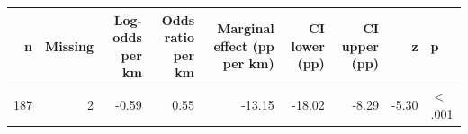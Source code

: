 \begingroup\footnotesize
\begin{tabular}{rrrrrrrrl}
  \toprule
n & Missing & Log-odds per km & Odds ratio per km & Marginal effect (pp per km) & CI lower (pp) & CI upper (pp) & z & p \\ 
  \midrule
187 &   2 & -0.59 & 0.55 & -13.15 & -18.02 & -8.29 & -5.30 & $<$.001 \\ 
   \bottomrule
\end{tabular}
\endgroup
